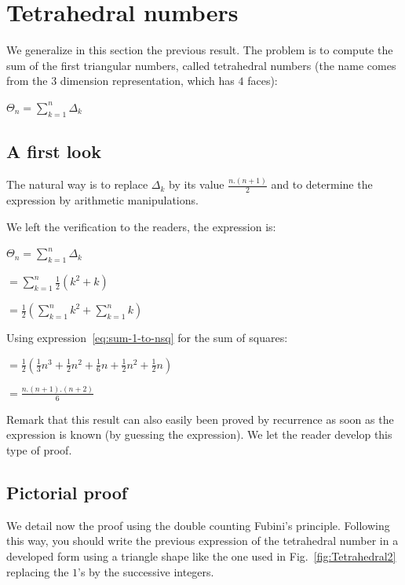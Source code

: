 \section{Tetrahedral numbers}
\label{sec:tetraedralNumbers}

We generalize in this section the previous result. The problem is to compute
the sum of the first triangular numbers, called tetrahedral numbers (the name comes from the 3 dimension representation, 
which has $4$ faces):

$\Theta_n =  \sum_{k=1}^{n} \Delta_k$

\subsection{A first look}

The natural way is to replace $\Delta_k$ by its value $\frac{n.(n+1)}{2}$ and to determine the expression
by arithmetic manipulations.

We left the verification to the readers, the expression is:

$\Theta_n =  \sum_{k=1}^{n} \Delta_k $

$=  \sum_{k=1}^{n} \frac{1}{2} (k^2 + k) $

$=  \frac{1}{2} (\sum_{k=1}^{n} k^2 + \sum_{k=1}^{n} k) $

Using expression~\ref{eq:sum-1-to-nsq} for the sum of squares:

$= \frac{1}{2} ( \frac{1}{3} n^3 + \frac{1}{2} n^2 + \frac{1}{6} n + \frac{1}{2} n^2 + \frac{1}{2} n )$

$= \frac{n.(n+1).(n+2)}{6}$

\medskip

Remark that this result can also easily been proved by recurrence as soon as the expression is known
(by guessing the expression).
We let the reader develop this type of proof. 


\subsection{Pictorial proof}

We detail now the proof using the double counting Fubini's principle.
Following this way, you should write the previous expression of the tetrahedral number in a developed form 
using a triangle shape like the one used in Fig.~\ref{fig:Tetrahedral2}
replacing the $1$'s by the successive integers.

